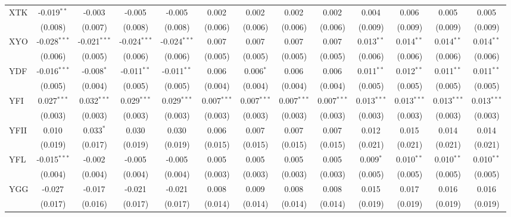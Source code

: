 \begin{table}[!htbp]
\begin{tabular}{@{\extracolsep{5pt}}lcccccccccccc}
 XTK & -0.019$^{**}$ & -0.003$^{}$ & -0.005$^{}$ & -0.005$^{}$ & 0.002$^{}$ & 0.002$^{}$ & 0.002$^{}$ & 0.002$^{}$ & 0.004$^{}$ & 0.006$^{}$ & 0.005$^{}$ & 0.005$^{}$ \\
  & (0.008) & (0.007) & (0.008) & (0.008) & (0.006) & (0.006) & (0.006) & (0.006) & (0.009) & (0.009) & (0.009) & (0.009) \\
 XYO & -0.028$^{***}$ & -0.021$^{***}$ & -0.024$^{***}$ & -0.024$^{***}$ & 0.007$^{}$ & 0.007$^{}$ & 0.007$^{}$ & 0.007$^{}$ & 0.013$^{**}$ & 0.014$^{**}$ & 0.014$^{**}$ & 0.014$^{**}$ \\
  & (0.006) & (0.005) & (0.006) & (0.006) & (0.005) & (0.005) & (0.005) & (0.005) & (0.006) & (0.006) & (0.006) & (0.006) \\
 YDF & -0.016$^{***}$ & -0.008$^{*}$ & -0.011$^{**}$ & -0.011$^{**}$ & 0.006$^{}$ & 0.006$^{*}$ & 0.006$^{}$ & 0.006$^{}$ & 0.011$^{**}$ & 0.012$^{**}$ & 0.011$^{**}$ & 0.011$^{**}$ \\
  & (0.005) & (0.004) & (0.005) & (0.005) & (0.004) & (0.004) & (0.004) & (0.004) & (0.005) & (0.005) & (0.005) & (0.005) \\
 YFI & 0.027$^{***}$ & 0.032$^{***}$ & 0.029$^{***}$ & 0.029$^{***}$ & 0.007$^{***}$ & 0.007$^{***}$ & 0.007$^{***}$ & 0.007$^{***}$ & 0.013$^{***}$ & 0.013$^{***}$ & 0.013$^{***}$ & 0.013$^{***}$ \\
  & (0.003) & (0.003) & (0.003) & (0.003) & (0.003) & (0.003) & (0.003) & (0.003) & (0.003) & (0.003) & (0.003) & (0.003) \\
 YFII & 0.010$^{}$ & 0.033$^{*}$ & 0.030$^{}$ & 0.030$^{}$ & 0.006$^{}$ & 0.007$^{}$ & 0.007$^{}$ & 0.007$^{}$ & 0.012$^{}$ & 0.015$^{}$ & 0.014$^{}$ & 0.014$^{}$ \\
  & (0.019) & (0.017) & (0.019) & (0.019) & (0.015) & (0.015) & (0.015) & (0.015) & (0.021) & (0.021) & (0.021) & (0.021) \\
 YFL & -0.015$^{***}$ & -0.002$^{}$ & -0.005$^{}$ & -0.005$^{}$ & 0.005$^{}$ & 0.005$^{}$ & 0.005$^{}$ & 0.005$^{}$ & 0.009$^{*}$ & 0.010$^{**}$ & 0.010$^{**}$ & 0.010$^{**}$ \\
  & (0.004) & (0.004) & (0.004) & (0.004) & (0.003) & (0.003) & (0.003) & (0.003) & (0.005) & (0.005) & (0.005) & (0.005) \\
 YGG & -0.027$^{}$ & -0.017$^{}$ & -0.021$^{}$ & -0.021$^{}$ & 0.008$^{}$ & 0.009$^{}$ & 0.008$^{}$ & 0.008$^{}$ & 0.015$^{}$ & 0.017$^{}$ & 0.016$^{}$ & 0.016$^{}$ \\
  & (0.017) & (0.016) & (0.017) & (0.017) & (0.014) & (0.014) & (0.014) & (0.014) & (0.019) & (0.019) & (0.019) & (0.019) \\

\end{tabular}
\end{table}
